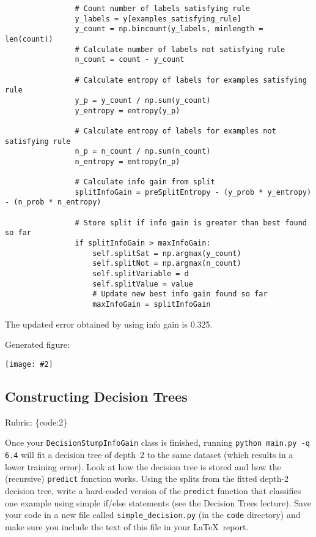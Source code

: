 \documentclass{article}
\def\rubric#1{\gre{Rubric: \{#1\}}}{}
\def\blu#1{{\color{blu}#1}}
\def\gre#1{{\color{gre}#1}}
\newcommand{\centerfig}[2]{\begin{center}\texttt{[image: \#2]}\end{center}}
\begin{document}
\begin{lstlisting}
                # Count number of labels satisfying rule
                y_labels = y[examples_satisfying_rule]
                y_count = np.bincount(y_labels, minlength = len(count))
                # Calculate number of labels not satisfying rule
                n_count = count - y_count

                # Calculate entropy of labels for examples satisfying rule
                y_p = y_count / np.sum(y_count)
                y_entropy = entropy(y_p)

                # Calculate entropy of labels for examples not satisfying rule
                n_p = n_count / np.sum(n_count)
                n_entropy = entropy(n_p)

                # Calculate info gain from split
                splitInfoGain = preSplitEntropy - (y_prob * y_entropy) - (n_prob * n_entropy)

                # Store split if info gain is greater than best found so far
                if splitInfoGain > maxInfoGain:
                    self.splitSat = np.argmax(y_count)
                    self.splitNot = np.argmax(n_count)
                    self.splitVariable = d
                    self.splitValue = value
                    # Update new best info gain found so far
                    maxInfoGain = splitInfoGain
\end{lstlisting}

\gre{The updated error obtained by using info gain is 0.325.}

\gre{Generated figure:}
\centerfig{0.7}{../figs/q6_3_decisionBoundary}

\subsection{Constructing Decision Trees}
\rubric{code:2}

Once your \texttt{DecisionStumpInfoGain} class is finished, running \texttt{python main.py -q 6.4} will fit
a decision tree of depth~2 to the same dataset (which results in a lower training error).
Look at how the decision tree is stored and how the (recursive) \texttt{predict} function works.
\blu{Using the splits from the fitted depth-2 decision tree, write a hard-coded version of the \texttt{predict}
function that classifies one example using simple if/else statements
(see the Decision Trees lecture).} Save your code in a new file called
\texttt{simple\string_decision.py} (in the \texttt{code} directory) and make sure you include the text of this file in your \LaTeX \, report.
\end{document}
